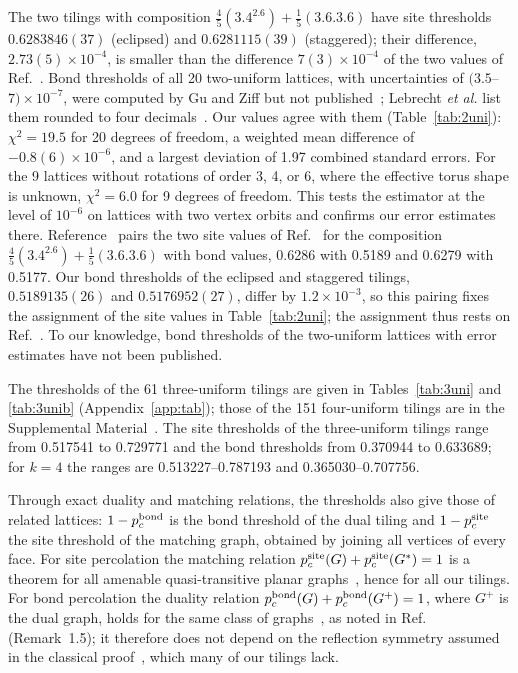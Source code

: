 \documentclass[pre,twocolumn,superscriptaddress,longbibliography,floatfix]{revtex4-2}
\newcommand{\ps}{p_c^{\rm site}}
\newcommand{\pb}{p_c^{\rm bond}}
\begin{document}
The two tilings with composition $\tfrac45(3.4^2.6)+\tfrac15(3.6.3.6)$ have site thresholds $0.6283846(37)$ (eclipsed) and $0.6281115(39)$ (staggered); their difference, $2.73(5)\times10^{-4}$, is smaller than the difference $7(3)\times10^{-4}$ of the two values of Ref.~\cite{Neher08supp}. Bond thresholds of all 20 two-uniform lattices, with uncertainties of $(3.5$--$7)\times10^{-7}$, were computed by Gu and Ziff but not published~\cite{GuZiff}; Lebrecht \textit{et al.} list them rounded to four decimals~\cite{Lebrecht21}. Our values agree with them (Table~\ref{tab:2uni}): $\chi^2=19.5$ for 20 degrees of freedom, a weighted mean difference of $-0.8(6)\times10^{-6}$, and a largest deviation of 1.97 combined standard errors. For the 9 lattices without rotations of order 3, 4, or 6, where the effective torus shape is unknown, $\chi^2=6.0$ for 9 degrees of freedom. This tests the estimator at the level of $10^{-6}$ on lattices with two vertex orbits and confirms our error estimates there. Reference~\cite{Lebrecht21} pairs the two site values of Ref.~\cite{Neher08supp} for the composition $\tfrac45(3.4^2.6)+\tfrac15(3.6.3.6)$ with bond values, 0.6286 with 0.5189 and 0.6279 with 0.5177. Our bond thresholds of the eclipsed and staggered tilings, $0.5189135(26)$ and $0.5176952(27)$, differ by $1.2\times10^{-3}$, so this pairing fixes the assignment of the site values in Table~\ref{tab:2uni}; the assignment thus rests on Ref.~\cite{Lebrecht21}. To our knowledge, bond thresholds of the two-uniform lattices with error estimates have not been published.

The thresholds of the 61 three-uniform tilings are given in Tables~\ref{tab:3uni} and \ref{tab:3unib} (Appendix~\ref{app:tab}); those of the 151 four-uniform tilings are in the Supplemental Material~\cite{SM}. The site thresholds of the three-uniform tilings range from 0.517541 to 0.729771 and the bond thresholds from 0.370944 to 0.633689; for $k=4$ the ranges are 0.513227--0.787193 and 0.365030--0.707756.

Through exact duality and matching relations, the thresholds also give those of related lattices: $1-\pb$ is the bond threshold of the dual tiling and $1-\ps$ the site threshold of the matching graph, obtained by joining all vertices of every face. For site percolation the matching relation $\ps(G)+\ps(G^\ast)=1$ is a theorem for all amenable quasi-transitive planar graphs~\cite{GrimmettLi24hyperbolic}, hence for all our tilings. For bond percolation the duality relation $\pb(G)+\pb(G^+)=1$, where $G^+$ is the dual graph, holds for the same class of graphs~\cite{LyonsPeres16}, as noted in Ref.~\cite{GrimmettLi24hyperbolic} (Remark~1.5); it therefore does not depend on the reflection symmetry assumed in the classical proof~\cite{Kesten82,WiermanZiff11}, which many of our tilings lack.
\end{document}
